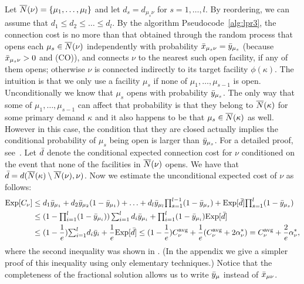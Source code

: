 Let ${\overline{N}}(\nu) = { \left\{ \mu_1,\ldots,\mu_l \right\} }$ and let $d_s
= d_{\mu_s\nu}$ for $s = 1,\ldots,l$. By reordering, we can
assume that $d_1 \le d_2 \le \ldots \le d_l$. By the
algorithm Pseudocode~\ref{alg:lpr3}, the connection cost is
no more than that obtained through the random process that
opens each $\mu_s\in {\overline{N}}(\nu)$ independently with
probability ${\bar x}_{\mu_s \nu} ={\bar y}_{\mu_s}$ (because
${\bar x}_{\mu_s \nu} > 0$ and (CO)), and connects $\nu$ to the
nearest such open facility, if any of them opens; otherwise
$\nu$ is connected indirectly to its target facility
$\phi(\kappa)$. The intuition is that we only use a facility
$\mu_s$ if none of $\mu_1,\ldots,\mu_{s-1}$ is
open. Unconditionally we know that $\mu_s$ opens with
probability ${\bar y}_{\mu_s}$. The only way that some of
$\mu_1,\ldots,\mu_{s-1}$ can affect that probability is that
they belong to ${\overline{N}}(\kappa)$ for some primary demand
$\kappa$ and it also happens to be that $\mu_s \in
{\overline{N}}(\kappa)$ as well. However in this case, the condition
that they are closed actually implies the conditional
probability of $\mu_s$ being open is larger than
${\bar y}_{\mu_s}$. For a detailed proof,
see~\cite{ChudakS04}. Let ${\bar d}$ denote the conditional
expected connection cost for $\nu$ conditioned on the event
that none of the facilities in ${\overline{N}}(\nu)$ opens. We have
that ${\bar d} = d({\overline{N}}(\kappa)\setminus {\overline{N}}(\nu),
\nu)$. Now we estimate the unconditional expected cost of
$\nu$ as follows:
%
\begin{align*}
  \mbox{\rm Exp}[C_\nu] &\leq d_1 {\bar y}_{\mu_1} + d_2 {\bar y}_{\mu_2}(1-{\bar y}_{\mu_1}) + \ldots
 		+  d_l {\bar y}_{\mu_l}\textstyle{\prod_{s=1}^{l-1}}(1-{\bar y}_{\mu_s}) 
		+  \mbox{\rm Exp}[{\bar d}]\textstyle{\prod_{s=1}^{l}} (1-{\bar y}_{\mu_s})
		\\
  &\leq (1-\textstyle{\prod_{i=1}^l} (1-{\bar y}_{\mu_i}))
  	\sum_{i=1}^l d_i{\bar y}_{\mu_i} + {\textstyle\prod_{i=1}^l} (1-\bar  y_{\mu_i})\mbox{\rm Exp}[{\bar d}]
	\\
  &\leq (1-\frac{1}{e}) {\textstyle\sum_{i=1}^l} d_i{\bar y}_i 
	+ \frac{1}{e} \mbox{\rm Exp}[{\bar d}] \leq (1-\frac{1}{e}) C^{{\mbox{\scriptsize\rm avg}}}_{\nu} 
	+	\frac{1}{e}	(C^{{\mbox{\scriptsize\rm avg}}}_{\nu} + 2\alpha_{\nu}^\ast) = C^{{\mbox{\scriptsize\rm avg}}}_{\nu} + \frac{2}{e}\alpha_{\nu}^\ast,
\end{align*}
%
where the second inequality was shown in
\cite{ChudakS04}. (In the appendix we give a simpler
proof of this inequality using only elementary techniques.)  Notice that the
completeness of the fractional solution allows us to write
${\bar y}_{\mu}$ instead of ${\bar x}_{\mu\nu}$.

